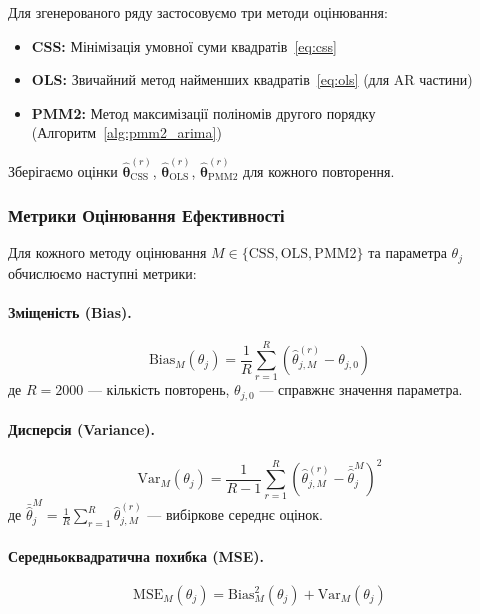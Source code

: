 \documentclass[12pt,a4paper]{article}
\begin{document}
Для згенерованого ряду застосовуємо три методи оцінювання:
\begin{itemize}
    \item \textbf{CSS:} Мінімізація умовної суми квадратів~\eqref{eq:css}
    \item \textbf{OLS:} Звичайний метод найменших квадратів~\eqref{eq:ols} (для AR частини)
    \item \textbf{PMM2:} Метод максимізації поліномів другого порядку (Алгоритм~\ref{alg:pmm2_arima})
\end{itemize}

Зберігаємо оцінки $\hat{\boldsymbol{\theta}}^{(r)}_{\text{CSS}}$, $\hat{\boldsymbol{\theta}}^{(r)}_{\text{OLS}}$, $\hat{\boldsymbol{\theta}}^{(r)}_{\text{PMM2}}$ для кожного повторення.

\subsubsection{Метрики Оцінювання Ефективності}

Для кожного методу оцінювання $M \in \{\text{CSS}, \text{OLS}, \text{PMM2}\}$ та параметра $\theta_j$ обчислюємо наступні метрики:

\paragraph{Зміщеність (Bias).}
\begin{equation}
\label{eq:bias}
\text{Bias}_M(\theta_j) = \frac{1}{R} \sum_{r=1}^{R} \left( \hat{\theta}_{j,M}^{(r)} - \theta_{j,0} \right)
\end{equation}
де $R = 2000$ --- кількість повторень, $\theta_{j,0}$ --- справжнє значення параметра.

\paragraph{Дисперсія (Variance).}
\begin{equation}
\label{eq:variance}
\text{Var}_M(\theta_j) = \frac{1}{R-1} \sum_{r=1}^{R} \left( \hat{\theta}_{j,M}^{(r)} - \bar{\hat{\theta}}_j^M \right)^2
\end{equation}
де $\bar{\hat{\theta}}_j^M = \frac{1}{R} \sum_{r=1}^{R} \hat{\theta}_{j,M}^{(r)}$ --- вибіркове середнє оцінок.

\paragraph{Середньоквадратична похибка (MSE).}
\begin{equation}
\label{eq:mse}
\text{MSE}_M(\theta_j) = \text{Bias}_M^2(\theta_j) + \text{Var}_M(\theta_j)
\end{equation}
\end{document}
